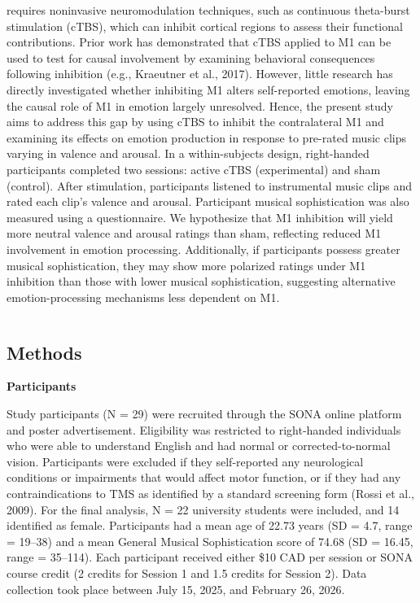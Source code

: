 \documentclass[
]{article}
\begin{document}
requires noninvasive neuromodulation techniques, such as continuous
theta-burst stimulation (cTBS), which can inhibit cortical regions to
assess their functional contributions. Prior work has demonstrated that
cTBS applied to M1 can be used to test for causal involvement by
examining behavioral consequences following inhibition (e.g., Kraeutner
et al., 2017). However, little research has directly investigated
whether inhibiting M1 alters self-reported emotions, leaving the causal
role of M1 in emotion largely unresolved. Hence, the present study aims
to address this gap by using cTBS to inhibit the contralateral M1 and
examining its effects on emotion production in response to pre-rated
music clips varying in valence and arousal. In a within-subjects design,
right-handed participants completed two sessions: active cTBS
(experimental) and sham (control). After stimulation, participants
listened to instrumental music clips and rated each clip's valence and
arousal. Participant musical sophistication was also measured using a
questionnaire. We hypothesize that M1 inhibition will yield more neutral
valence and arousal ratings than sham, reflecting reduced M1 involvement
in emotion processing. Additionally, if participants possess greater
musical sophistication, they may show more polarized ratings under M1
inhibition than those with lower musical sophistication, suggesting
alternative emotion-processing mechanisms less dependent on M1.

\begin{verbatim}
\end{verbatim}

\subsection{Methods}\label{methods}

\textbf{Participants}

Study participants (N = 29) were recruited through the SONA online
platform and poster advertisement. Eligibility was restricted to
right-handed individuals who were able to understand English and had
normal or corrected-to-normal vision. Participants were excluded if they
self-reported any neurological conditions or impairments that would
affect motor function, or if they had any contraindications to TMS as
identified by a standard screening form (Rossi et al., 2009). For the
final analysis, N = 22 university students were included, and 14
identified as female. Participants had a mean age of 22.73 years (SD =
4.7, range = 19--38) and a mean General Musical Sophistication score of
74.68 (SD = 16.45, range = 35--114). Each participant received either
\$10 CAD per session or SONA course credit (2 credits for Session 1 and
1.5 credits for Session 2). Data collection took place between July 15,
2025, and February 26, 2026.
\end{document}
